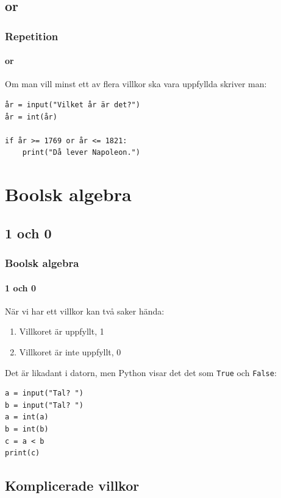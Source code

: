 \documentclass{beamer}
\begin{document}
\subsection{or}

\begin{frame}[fragile]
	\frametitle{Repetition}
	\framesubtitle{or}
	
	Om man vill minst ett av flera villkor ska vara uppfyllda skriver man:
	
	\begin{lstlisting}
år = input("Vilket år är det?")
år = int(år)

if år >= 1769 or år <= 1821:
    print("Då lever Napoleon.")
	\end{lstlisting}
	
\end{frame}

\section{Boolsk algebra}

\subsection{1 och 0}

\begin{frame}[fragile]
	\frametitle{Boolsk algebra}
	\framesubtitle{1 och 0}
	
	När vi har ett villkor kan två saker hända:
	
	\begin{enumerate}
		\item Villkoret är uppfyllt, 1
		\item Villkoret är inte uppfyllt, 0
	\end{enumerate}
	
	\pause
	
	Det är likadant i datorn, men Python visar det det som \texttt{True} och \texttt{False}:
	
	\begin{lstlisting}
a = input("Tal? ")
b = input("Tal? ")
a = int(a)
b = int(b)
c = a < b
print(c)
	\end{lstlisting}
	
\end{frame}

\subsection{Komplicerade villkor}
\end{document}

